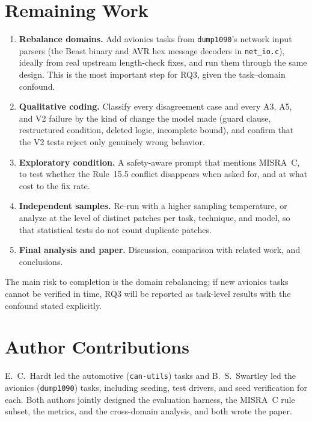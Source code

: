\documentclass[12pt]{IEEEtran}
\begin{document}
\section{Remaining Work}
\label{sec:remaining}
\begin{enumerate}
    \item \textbf{Rebalance domains.} Add avionics tasks from \texttt{dump1090}'s network input parsers (the Beast binary and AVR hex message decoders in \texttt{net\_io.c}), ideally from real upstream length-check fixes, and run them through the same design. This is the most important step for RQ3, given the task--domain confound.
    \item \textbf{Qualitative coding.} Classify every disagreement case and every A3, A5, and V2 failure by the kind of change the model made (guard clause, restructured condition, deleted logic, incomplete bound), and confirm that the V2 tests reject only genuinely wrong behavior.
    \item \textbf{Exploratory condition.} A safety-aware prompt that mentions MISRA~C, to test whether the Rule~15.5 conflict disappears when asked for, and at what cost to the fix rate.
    \item \textbf{Independent samples.} Re-run with a higher sampling temperature, or analyze at the level of distinct patches per task, technique, and model, so that statistical tests do not count duplicate patches.
    \item \textbf{Final analysis and paper.} Discussion, comparison with related work, and conclusions.
\end{enumerate}
The main risk to completion is the domain rebalancing; if new avionics tasks cannot be verified in time, RQ3 will be reported as task-level results with the confound stated explicitly.

\section*{Author Contributions}
E.~C.~Hardt led the automotive (\texttt{can-utils}) tasks and B.~S.~Swartley led the avionics (\texttt{dump1090}) tasks, including seeding, test drivers, and seed verification for each. Both authors jointly designed the evaluation harness, the MISRA~C rule subset, the metrics, and the cross-domain analysis, and both wrote the paper.

\appendices
\end{document}
